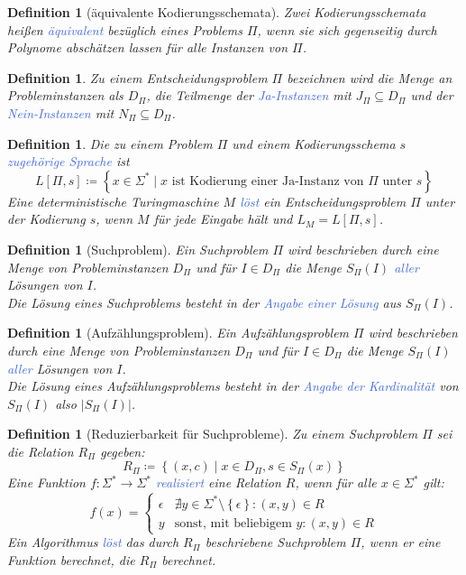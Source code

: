 \documentclass[11pt]{scrartcl}
\newcommand{\tcol}[1]{\textcolor{RoyalBlue}{#1}}
\newcommand{\set}[1]{\left\lbrace #1\right\rbrace}
\theoremstyle{break}
\newtheorem{defi}[satz]{Definition}
\begin{document}
    \begin{defi}[äquivalente Kodierungsschemata]
        Zwei Kodierungsschemata heißen \tcol{äquivalent} bezüglich eines Problems $\Pi$, wenn sie sich gegenseitig durch Polynome abschätzen lassen für alle Instanzen von $\Pi$.
    \end{defi}

    \begin{defi}
        Zu einem Entscheidungsproblem $\Pi$ bezeichnen wird die Menge an Probleminstanzen als $D_\Pi$, die Teilmenge der \tcol{Ja-Instanzen} mit $J_\Pi\subseteq D_\Pi$ und der \tcol{Nein-Instanzen} mit $N_\Pi\subseteq D_\Pi$.
    \end{defi}

    \begin{defi}
        Die zu einem Problem $\Pi$ und einem Kodierungsschema $s$ \tcol{zugehörige Sprache} ist
        \[L[\Pi,s]\coloneqq\set{x\in\Sigma^*\mid x\text{ ist Kodierung einer Ja-Instanz von $\Pi$ unter $s$}}\]
        Eine deterministische Turingmaschine $M$ \tcol{löst} ein Entscheidungsproblem $\Pi$ unter der Kodierung $s$, wenn $M$ für jede Eingabe hält und $L_M=L[\Pi,s]$.
    \end{defi}

    \begin{defi}[Suchproblem]
        Ein Suchproblem $\Pi$ wird beschrieben durch eine Menge von Probleminstanzen $D_\Pi$ und für $I\in D_\Pi$ die Menge $S_\Pi(I)$ \tcol{aller} Lösungen von $I$.\\
        Die Lösung eines Suchproblems besteht in der \tcol{Angabe einer Lösung} aus $S_\Pi(I)$.
    \end{defi}

    \begin{defi}[Aufzählungsproblem]
        Ein Aufzählungsproblem $\Pi$ wird beschrieben durch eine Menge von Probleminstanzen $D_\Pi$ und für $I\in D_\Pi$ die Menge $S_\Pi(I)$ \tcol{aller} Lösungen von $I$.\\
        Die Lösung eines Aufzählungsproblems besteht in der \tcol{Angabe der Kardinalität} von $S_\Pi(I)$ also $|S_\Pi(I)|$.
    \end{defi}

    \begin{defi}[Reduzierbarkeit für Suchprobleme]
        Zu einem Suchproblem $\Pi$ sei die Relation $R_\Pi$ gegeben:
        \[R_\Pi\coloneqq\set{(x,c)\mid x\in D_\Pi,s\in S_\Pi(x)}\]
        Eine Funktion $f\colon\Sigma^*\to\Sigma^*$ \tcol{realisiert} eine Relation $R$, wenn für alle $x\in\Sigma^*$ gilt:
        \[f(x)= \begin{cases}
                    \epsilon & \nexists y\in\Sigma^*\setminus\set{\epsilon}\colon (x,y)\in R \\
                    y & \text{sonst, mit beliebigem } y\colon (x,y)\in R
        \end{cases}
        \]
        Ein Algorithmus \tcol{löst} das durch $R_\Pi$ beschriebene Suchproblem $\Pi$, wenn er eine Funktion berechnet, die $R_\Pi$ berechnet.
    \end{defi}
\end{document}
